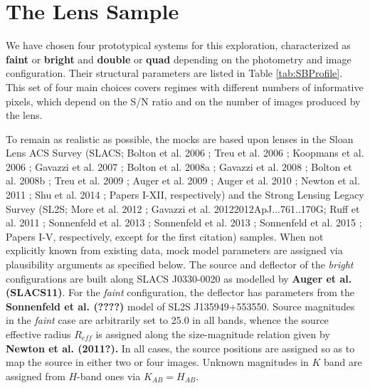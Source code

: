 \documentclass[a4paper,11pt]{article}
\begin{document}
\section{The Lens Sample}

We have chosen four prototypical systems for this exploration, characterized as \textbf{faint} or \textbf{bright} and \textbf{double} or \textbf{quad} depending on the photometry and image configuration. Their structural parameters are listed in Table \ref{tab:SBProfile}. This set of four main choices covers regimes with different numbers of informative pixels, which depend on the S/N ratio and on the number of images produced by the lens.

To remain as realistic as possible, the mocks are based upon lenses in the Sloan Lens ACS Survey (SLACS; Bolton et al. 2006 \cite{2006ApJ...638..703B}; Treu et al. 2006 \cite{2006ApJ...640..662T}; Koopmans et al. 2006 \cite{2006ApJ...649..599K}; Gavazzi et al. 2007 \cite{2007ApJ...667..176G}; Bolton et al. 2008a \cite{2008ApJ...682..964B}; Gavazzi et al. 2008 \cite{2008ApJ...677.1046G}; Bolton et al. 2008b \cite{2008ApJ...684..248B}; Treu et al. 2009 \cite{2009ApJ...690..670T}; Auger et al. 2009 \cite{2009ApJ...705.1099A}; Auger et al. 2010 \cite{2010ApJ...724..511A}; Newton et al. 2011 \cite{2011ApJ...734..104N}; Shu et al. 2014 \cite{2014arXiv1407.2240S}; Papers I-XII, respectively) and the Strong Lensing Legacy Survey (SL2S; More et al. 2012 \cite{2012ApJ...749...38M}; Gavazzi et al. 2012{2012ApJ...761..170G}; Ruff et al. 2011 \cite{2011ApJ...727...96R}; Sonnenfeld et al. 2013 \cite{2013ApJ...777...97S}; Sonnenfeld et al. 2013 \cite{2013ApJ...777...98S}; Sonnenfeld et al. 2015 \cite{2015ApJ...800...94S}; Papers I-V, respectively, except for the first citation) samples. When not explicitly known from existing data, mock model parameters are assigned via plausibility arguments as specified below. The source and deflector of the \textit{bright} configurations are built along SLACS J0330-0020 as modelled by \textbf{Auger et al.(SLACS11)}. For the \textit{faint} configuration, the deflector has parameters from the \textbf{Sonnenfeld et al. (????)} model of SL2S J135949+553550.
 Source magnitudes in the \textit{faint} case are arbitrarily set to 25.0 in all bands, whence the source effective radius $R_{eff}$ is assigned along the size-magnitude relation given by \textbf{Newton et al. (2011?).} In all cases, the source positions are assigned so as to map the source in either two or four images. Unknown magnitudes in $K$ band are assigned from $H$-band ones via $K_{AB}=H_{AB}.$
 
\end{document}
